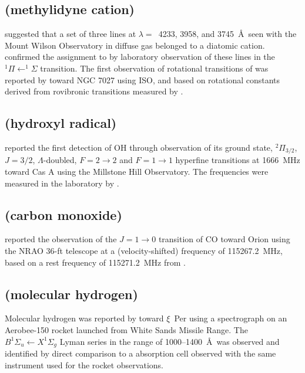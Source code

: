 \documentclass[twocolumn]{aastex631}
\begin{document}
    \subsection{ (methylidyne cation)}
    \label{CH+}
    
    \citet{Swings:1937dl} suggested that a set of three lines at $\lambda =$~4233, 3958, and 3745~\AA~seen with the Mount Wilson Observatory in diffuse gas belonged to a diatomic cation.  \citet{Douglas:1941uc} confirmed the assignment to  by laboratory observation of these lines in the $^1\Pi \leftarrow ^1\Sigma$ transition.  The first observation of rotational transitions of  was reported by \citet{Cernicharo:1997il} toward NGC 7027 using ISO, and based on rotational constants derived from rovibronic transitions measured by \citet{Carrington:1982ep}.  
    
    \subsection{ (hydroxyl radical)}
    \label{OH}

    \citet{Weinreb:1963lf} reported the first detection of OH through observation of its ground state, $^2\Pi _{3/2}$, $J = 3/2$, $\Lambda$-doubled, $F = 2\rightarrow2$ and $F = 1\rightarrow1$ hyperfine transitions at 1666~MHz toward Cas A using the Millstone Hill Observatory.  The frequencies were measured in the laboratory by \citet{Ehrenstein:1959jj}.
    
    \subsection{ (carbon monoxide)}
    \label{CO}
    
    \citet{Wilson:1970jm} reported the observation of the $J = 1\rightarrow0$ transition of CO toward Orion using the NRAO 36-ft telescope at a (velocity-shifted) frequency of 115267.2~MHz, based on a rest frequency of 115271.2~MHz from \citet{Cord:1968kw}.
    
    \subsection{ (molecular hydrogen)}
    \label{H2}
    
    Molecular hydrogen was reported by \citet{Carruthers:1970my} toward $\xi$~Per using a spectrograph on an Aerobee-150 rocket launched from White Sands Missile Range.  The $B^1\Sigma _u \leftarrow X^1\Sigma _g$ Lyman series in the range of 1000--1400~\AA~was observed and identified by direct comparison to a absorption cell observed with the same instrument used for the rocket observations.
    
\end{document}
